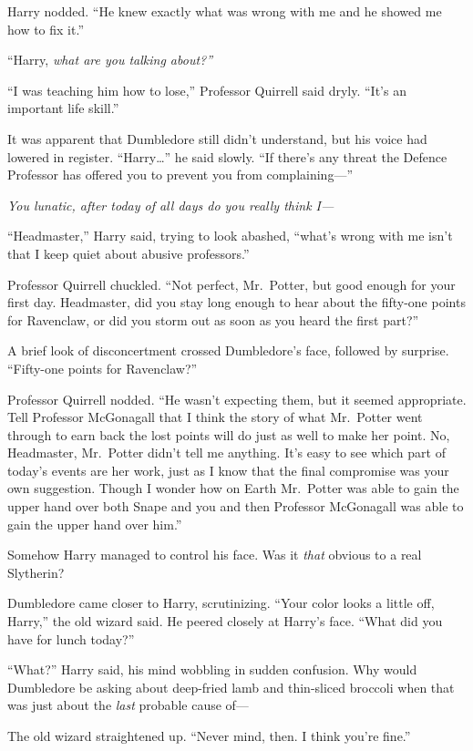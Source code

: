 Harry nodded. ``He knew exactly what was wrong with me and he showed me
how to fix it.''

``Harry, \emph{what are you talking about?''}

``I was teaching him how to lose,'' Professor Quirrell said dryly.
``It's an important life skill.''

It was apparent that Dumbledore still didn't understand, but his voice
had lowered in register. ``Harry\ldots{}'' he said slowly. ``If there's
any threat the Defence Professor has offered you to prevent you from
complaining---''

\emph{You lunatic, after today of all days do you really think I---}

``Headmaster,'' Harry said, trying to look abashed, ``what's wrong with
me isn't that I keep quiet about abusive professors.''

Professor Quirrell chuckled. ``Not perfect, Mr.~Potter, but good enough
for your first day. Headmaster, did you stay long enough to hear about
the fifty-one points for Ravenclaw, or did you storm out as soon as you
heard the first part?''

A brief look of disconcertment crossed Dumbledore's face, followed by
surprise. ``Fifty-one points for Ravenclaw?''

Professor Quirrell nodded. ``He wasn't expecting them, but it seemed
appropriate. Tell Professor McGonagall that I think the story of what
Mr.~Potter went through to earn back the lost points will do just as
well to make her point. No, Headmaster, Mr.~Potter didn't tell me
anything. It's easy to see which part of today's events are her work,
just as I know that the final compromise was your own suggestion. Though
I wonder how on Earth Mr.~Potter was able to gain the upper hand over
both Snape and you and then Professor McGonagall was able to gain the
upper hand over him.''

Somehow Harry managed to control his face. Was it \emph{that} obvious to
a real Slytherin?

Dumbledore came closer to Harry, scrutinizing. ``Your color looks a
little off, Harry,'' the old wizard said. He peered closely at Harry's
face. ``What did you have for lunch today?''

``What?'' Harry said, his mind wobbling in sudden confusion. Why would
Dumbledore be asking about deep-fried lamb and thin-sliced broccoli when
that was just about the \emph{last} probable cause of---

The old wizard straightened up. ``Never mind, then. I think you're
fine.''

